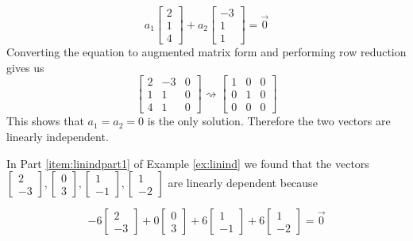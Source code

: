 \documentclass{ximera}
\begin{document}
\begin{example}
\begin{explanation}
 $$a_1\begin{bmatrix}2\\1\\4\end{bmatrix}+a_2\begin{bmatrix}-3\\1\\1\end{bmatrix}=\vec{0}$$
 Converting the equation to augmented matrix form and performing row reduction gives us
 $$\left[\begin{array}{cc|c}  
 2&-3&0\\1&1&0\\4&1&0
 \end{array}\right]\rightsquigarrow\left[\begin{array}{cc|c}  
 1&0&0\\0&1&0\\0&0&0
 \end{array}\right]$$
 This shows that $a_1=a_2=0$ is the only solution.  Therefore the two vectors are linearly independent.
\end{explanation}
\end{example}

In Part \ref{item:linindpart1} of Example \ref{ex:linind} we found that the vectors $\begin{bmatrix}2\\-3\end{bmatrix}, \begin{bmatrix}0\\3\end{bmatrix},\begin{bmatrix}1\\-1\end{bmatrix},\begin{bmatrix}1\\-2\end{bmatrix}$ are linearly dependent because

\begin{equation}\label{eq:nontrivrel}
-6\begin{bmatrix}2\\-3\end{bmatrix}+0 \begin{bmatrix}0\\3\end{bmatrix}+6\begin{bmatrix}1\\-1\end{bmatrix}+6\begin{bmatrix}1\\-2\end{bmatrix}=\vec{0}\end{equation}
\end{document}
